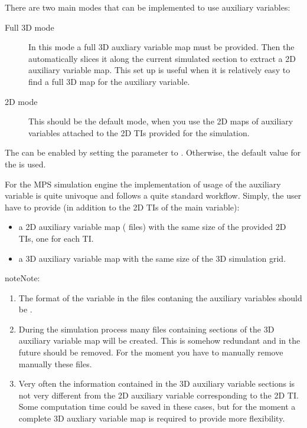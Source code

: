 \documentclass[letterpaper,10pt,english]{sphinxmanual}
\begin{document}
There are two main modes that can be implemented to use auxiliary variables:
\begin{description}
\item[{Full 3D mode}] \leavevmode
In this mode a full 3D auxliary variable map must be
provided. Then the  automatically slices it along the
current simulated section to extract a 2D auxiliary variable
map. This set up is useful when it is relatively easy to find a
full 3D map for the auxiliary variable.

\item[{2D mode}] \leavevmode
This should be the default mode, when you use the 2D maps of
auxiliary variables attached to the 2D TIs provided for the
simulation.

\end{description}

The  can be enabled by setting the
 parameter to . Otherwise,
the default value for the  is used.

For the  MPS simulation engine the implementation of usage
of the auxiliary variable is quite univoque and follows a quite
standard workflow.  Simply, the user have to provide (in addition to
the 2D TIs of the main variable):
\begin{itemize}
\item {} 
a 2D auxiliary variable map ( files) with the same size of
the provided 2D TIs, one for each TI.

\item {} 
a 3D auxiliary variable map with the same size of the 3D simulation
grid.

\end{itemize}

\begin{sphinxadmonition}{note}{Note:}\begin{enumerate}
%
\item {} 
The format of the variable in the  files contaning the
auxiliary variables should be .

\item {} 
During the simulation process many  files containing
sections of the 3D auxiliary variable map will be created. This
is somehow redundant and in the future should be removed. For
the moment you have to manually remove manually these files.

\item {} 
Very often the information contained in the 3D auxiliary
variable sections is not very different from the 2D auxiliary
variable corresponding to the 2D TI. Some computation time
could be saved in these cases, but for the moment a complete 3D
auxliary variable map is required to provide more flexibility.

\end{enumerate}
\end{sphinxadmonition}
\end{document}
